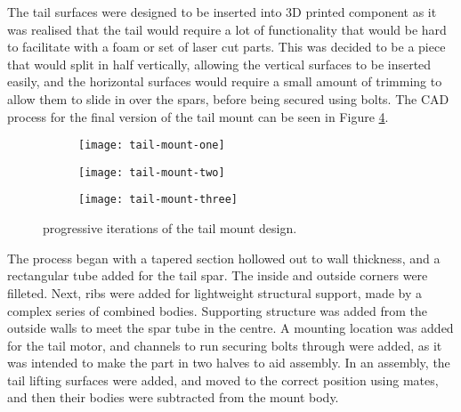 \documentclass[../../main.tex]{subfiles}
\begin{document}
The tail surfaces were designed to be inserted into 3D printed component as it was realised that the tail would require a lot of functionality that would be hard to facilitate with a foam or set of laser cut parts.
This was decided to be a piece that would split in half vertically, allowing the vertical surfaces to be inserted easily, and the horizontal surfaces would require a small amount of trimming to allow them to slide in over the spars, before being secured using bolts.
The CAD process for the final version of the tail mount can be seen in Figure \ref{fig:tail-mount-progression}.


\begin{figure}[H]
    \centering
    \begin{subfigure}[b]{0.32\columnwidth}
        \centering
        \texttt{[image: tail-mount-one]}
        \caption{}
        \label{fig:tail-mount-progression:initial}
    \end{subfigure}
    \hfill
    \begin{subfigure}[b]{0.32\columnwidth}
        \centering
        \texttt{[image: tail-mount-two]}
        \caption{}
        \label{fig:tail-mount-progression:revised}
    \end{subfigure}
    \hfill
    \begin{subfigure}[b]{0.32\columnwidth}
        \centering
        \texttt{[image: tail-mount-three]}
        \caption{}
        \label{fig:tail-mount-progression:final}
    \end{subfigure}
    
    \caption{progressive iterations of the tail mount design.}
    \label{fig:tail-mount-progression}
\end{figure} 


The process began with a tapered section hollowed out to  wall thickness, and a rectangular tube added for the tail spar.
The inside and outside corners were filleted. 
Next, ribs were added for lightweight structural support, made by a complex series of combined bodies.
Supporting structure was added from the outside walls to meet the spar tube in the centre.
A mounting location was added for the tail motor, and channels to run securing bolts through were added, as it was intended to make the part in two halves to aid assembly.  
In an assembly, the tail lifting surfaces were added, and moved to the correct position using mates, and then their bodies were subtracted from the mount body. 
\end{document}
